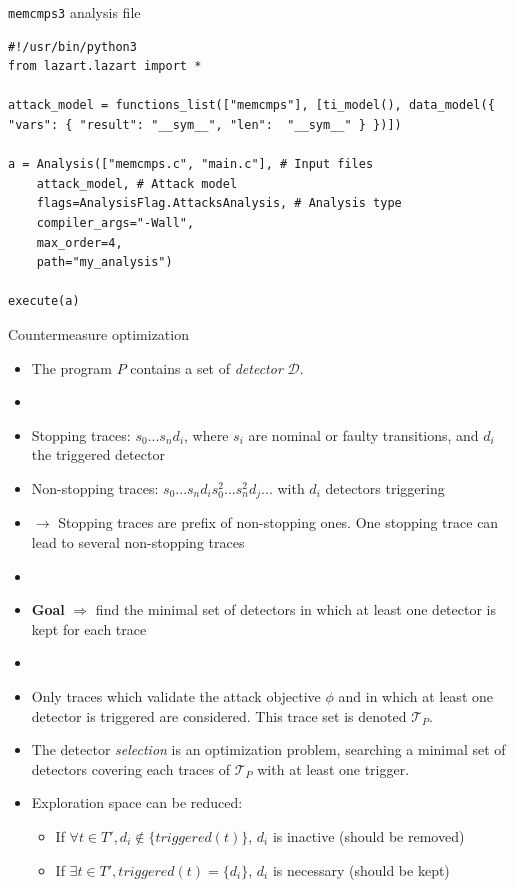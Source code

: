 \begin{frame}{\texttt{memcmps3} analysis file} 
    \lstset{style=custompython}
    \begin{lstlisting}
#!/usr/bin/python3
from lazart.lazart import *

attack_model = functions_list(["memcmps"], [ti_model(), data_model({ "vars": { "result": "__sym__", "len":  "__sym__" } })])

a = Analysis(["memcmps.c", "main.c"], # Input files 
    attack_model, # Attack model
    flags=AnalysisFlag.AttacksAnalysis, # Analysis type
    compiler_args="-Wall",
    max_order=4,
    path="my_analysis")

execute(a)
    \end{lstlisting}
\end{frame}

\begin{frame}{Countermeasure optimization} 
    \begin{small}
        \begin{itemize}
            \item The program $P$ contains a set of \textit{detector} $\mathcal{D}$. 
            \item[]
            \item[] Stopping traces: $s_0 ... s_n d_i$, where $s_i$ are nominal or faulty transitions, and $d_i$ the triggered detector
            \item[] Non-stopping traces: $s_0 ... s_n d_i s^2_0 ... s^2_n d_j ...$ with $d_i$ detectors triggering
            \item[] $\rightarrow$ Stopping traces are prefix of non-stopping ones. One stopping trace can lead to several non-stopping traces
            \item [] 
            \item \textbf{Goal} $\Rightarrow$ find the minimal set of detectors in which at least one detector is kept for each trace
            \item [] 
            \item Only traces which validate the attack objective $\phi$ and in which at least one detector is triggered are considered. This trace set is denoted $\mathcal{T}_P$.
            \item[] The detector \textit{selection} is an optimization problem, searching a minimal set of detectors covering each traces of $\mathcal{T}_P$ with at least one trigger.
            \item[] Exploration space can be reduced:
            \begin{itemize}
                \item If $\forall t \in T', d_i \not\in  \{triggered(t)\}$, $d_i$ is inactive (should be removed)
            \item If $\exists t \in T', triggered(t) = \{d_i\}$, $d_i$ is necessary (should be kept)
            \end{itemize}
        \end{itemize}
    \end{small}
\end{frame}

